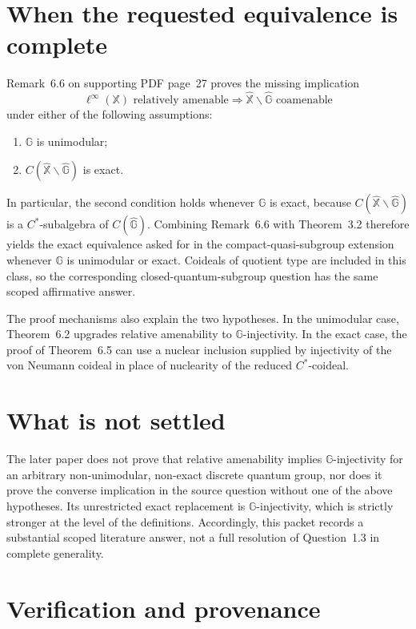 \documentclass[11pt]{article}
\newcommand{\G}{\mathbb G}
\newcommand{\X}{\mathbb X}
\newcommand{\wideG}{\widehat{\mathbb G}}
\newcommand{\wideX}{\widehat{\mathbb X}}
\begin{document}
\section*{When the requested equivalence is complete}

Remark~6.6 on supporting PDF page~27 proves the missing implication
\[
 \ell^\infty(\X)\text{ relatively amenable}
 \Longrightarrow
 \wideX\backslash\wideG\text{ coamenable}
\]
under either of the following assumptions:
\begin{enumerate}
 \item $\G$ is unimodular;
 \item $C(\wideX\backslash\wideG)$ is exact.
\end{enumerate}
In particular, the second condition holds whenever $\G$ is exact, because
$C(\wideX\backslash\wideG)$ is a $C^*$-subalgebra of $C(\wideG)$.
Combining Remark~6.6 with Theorem~3.2 therefore yields the exact equivalence
asked for in the compact-quasi-subgroup extension whenever $\G$ is
unimodular or exact.  Coideals of quotient type are included in this class,
so the corresponding closed-quantum-subgroup question has the same scoped
affirmative answer.

The proof mechanisms also explain the two hypotheses.  In the unimodular
case, Theorem~6.2 upgrades relative amenability to $\G$-injectivity.  In the
exact case, the proof of Theorem~6.5 can use a nuclear inclusion supplied by
injectivity of the von Neumann coideal in place of nuclearity of the reduced
$C^*$-coideal.

\section*{What is not settled}

The later paper does not prove that relative amenability implies
$\G$-injectivity for an arbitrary non-unimodular, non-exact discrete quantum
group, nor does it prove the converse implication in the source question
without one of the above hypotheses.  Its unrestricted exact replacement is
$\G$-injectivity, which is strictly stronger at the level of the definitions.
Accordingly, this packet records a substantial scoped literature answer, not
a full resolution of Question~1.3 in complete generality.

\section*{Verification and provenance}
\end{document}
